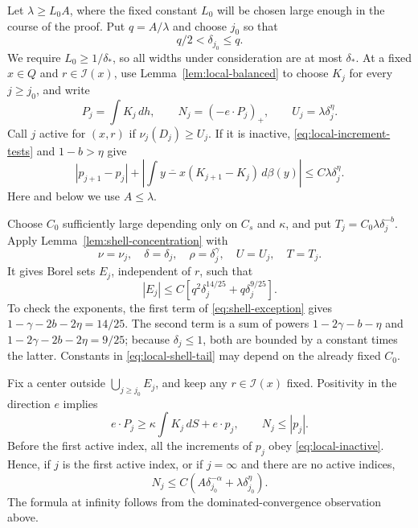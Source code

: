Let $\lambda\ge L_0A$, where the fixed constant $L_0$ will be chosen
large enough in the course of the proof. Put $q=A/\lambda$ and choose
$j_0$ so that
\begin{equation}\label{eq:local-start-scale}
q/2<\delta_{j_0}\le q.
\end{equation}
We require $L_0\ge1/\delta_*$, so all widths under consideration are
at most $\delta_*$. At a fixed $x\in Q$ and $r\in\mathcal I(x)$,
use Lemma~\ref{lem:local-balanced} to choose $K_j$ for every
$j\ge j_0$, and write
\[
P_j=\int K_j\,dh,
\qquad N_j=(-e\cdot P_j)_+,
\qquad U_j=\lambda\delta_j^\eta.
\]
Call $j$ active for $(x,r)$ if $\nu_j(D_j)\ge U_j$.
If it is inactive, \eqref{eq:local-increment-tests} and
$1-b>\eta$ give
\begin{equation}\label{eq:local-inactive}
|p_{j+1}-p_j|
+\left|\int\overline{y-x}(K_{j+1}-K_j)\,d\beta(y)\right|
 \le C\lambda\delta_j^\eta.
\end{equation}
Here and below we use $A\le\lambda$.

Choose $C_0$ sufficiently large depending only on $C_s$ and $\kappa$,
and put $T_j=C_0\lambda\delta_j^{-b}$. Apply
Lemma~\ref{lem:shell-concentration} with
\[
\nu=\nu_j,\quad \delta=\delta_j,\quad
\rho=\delta_j^\gamma,\quad U=U_j,\quad T=T_j.
\]
It gives Borel sets $E_j$, independent of $r$, such that
\begin{equation}\label{eq:local-shell-tail}
|E_j|\le C\left[
q^2\delta_j^{14/25}+q\delta_j^{9/25}\right].
\end{equation}
To check the exponents, the first term of
\eqref{eq:shell-exception} gives
$1-\gamma-2b-2\eta=14/25$. The second term is a sum of powers
$1-2\gamma-b-\eta$ and $1-2\gamma-2b-2\eta=9/25$; because
$\delta_j\le1$, both are bounded by a constant times the latter.
Constants in \eqref{eq:local-shell-tail} may depend on the already
fixed $C_0$.

Fix a center outside $\bigcup_{j\ge j_0}E_j$, and keep any
$r\in\mathcal I(x)$ fixed. Positivity in the direction $e$ implies
\begin{equation}\label{eq:local-cone-sign}
e\cdot P_j\ge\kappa\int K_j\,dS+e\cdot p_j,
\qquad N_j\le|p_j|.
\end{equation}
Before the first active index, all the increments of $p_j$ obey
\eqref{eq:local-inactive}. Hence, if $j$ is the first active index,
or if $j=\infty$ and there are no active indices,
\begin{equation}\label{eq:local-first-active}
N_j\le C\left(A\delta_{j_0}^{-\alpha}
                   +\lambda\delta_{j_0}^\eta\right).
\end{equation}
The formula at infinity follows from the dominated-convergence
observation above.

